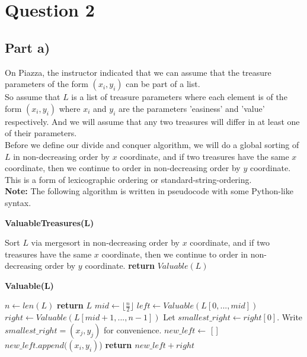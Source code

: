 \documentclass[12pt]{article}
\begin{document}
\newpage

\section*{Question 2}

\subsection*{Part a)}

On Piazza, the instructor indicated that we can assume that the treasure parameters of the form $(x_i,y_i)$ can be part of a list. \\

So assume that $L$ is a list of treasure parameters where each element is of the form $(x_i,y_i)$ where $x_i$ and $y_i$ are the parameters 'easiness' and 'value' respectively. And we will assume that any two treasures will differ in at least one of their parameters. \\

Before we define our divide and conquer algorithm, we will do a global sorting of $L$ in non-decreasing order by $x$ coordinate, and if two treasures have the same $x$ coordinate, then we continue to order in non-decreasing order by $y$ coordinate. This is a form of lexicographic ordering or standard-string-ordering. \\

\textbf{Note:} The following algorithm is written in pseudocode with some Python-like syntax. 
\begin{algorithm}[hbt!]
\caption{\textbf{ValuableTreasures(L)}}\label{alg:cap}

\begin{algorithmic}[1]
\State Sort $L$ via mergesort in non-decreasing order by $x$ coordinate, and if two treasures have the same $x$ coordinate, then we continue to order in non-decreasing order by $y$ coordinate.
\State \textbf{return} $Valuable(L)$
\end{algorithmic}
\end{algorithm}

\begin{algorithm}[hbt!]
\caption{\textbf{Valuable(L)}}\label{alg:cap}

\begin{algorithmic}[1]
\State $n \gets len(L)$ 
    \State \textbf{return} $L$
\EndIf
\State {}
\State $mid \gets \lfloor \frac{n}{2} \rfloor$ 
\State $left \gets Valuable(L[0,...,mid])$ 
\State $right \gets Valuable(L[mid + 1,...,n-1])$ 
\State
\State Let $smallest\_right \gets right[0]$. Write $smallest\_right = (x_j, y_j)$ for convenience.
\State $new\_left \gets $ [ ]
        \State $new\_left.append((x_i, y_i)$)
    \EndIf
\EndFor
\State
\State \textbf{return $new\_left + right$} 
\end{algorithmic}
\end{algorithm}
\end{document}
